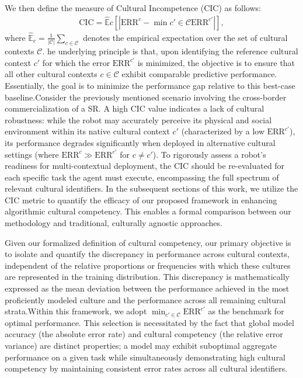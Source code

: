 We then define the measure of Cultural Incompetence (CIC) as follows:
%
\begin{align}\label{ch2:eq:cic}
\text{CIC} = \hat{\mathbb{E}}c \left[ \left| \text{ERR}^c - \min{c' \in \mathcal{C}} \text{ERR}^{c'} \right| \right],
\end{align}
%
where $\hat{\mathbb{E}}_c = \frac{1}{|\mathcal{C}|} \sum_{c \in \mathcal{C}}$ denotes the empirical expectation over the set of cultural contexts $\mathcal{C}$.
he underlying principle is that, upon identifying the reference cultural context $c'$ for which the error $\text{ERR}^{c'}$ is minimized, the objective is to ensure that all other cultural contexts $c \in \mathcal{C}$ exhibit comparable predictive performance. Essentially, the goal is to minimize the performance gap relative to this best-case baseline.Consider the previously mentioned scenario involving the cross-border commercialization of a SR. 
A high CIC value indicates a lack of cultural robustness: while the robot may accurately perceive its physical and social environment within its native cultural context $c'$ (characterized by a low $\text{ERR}^{c'}$), its performance degrades significantly when deployed in alternative cultural settings (where $\text{ERR}^c \gg \text{ERR}^{c'}$ for $c \neq c'$).
To rigorously assess a robot's readiness for multi-contextual deployment, the CIC should be re-evaluated for each specific task the agent must execute, encompassing the full spectrum of relevant cultural identifiers. 
In the subsequent sections of this work, we utilize the CIC metric to quantify the efficacy of our proposed framework in enhancing algorithmic cultural competency. 
This enables a formal comparison between our methodology and traditional, culturally agnostic approaches.

Given our formalized definition of cultural competency, our primary objective is to isolate and quantify the discrepancy in performance across cultural contexts, independent of the relative proportions or frequencies with which these cultures are represented in the training distribution. This discrepancy is mathematically expressed as the mean deviation between the performance achieved in the most proficiently modeled culture and the performance across all remaining cultural strata.Within this framework, we adopt $\min_{c' \in \mathcal{C}} \text{ERR}^{c'}$ as the benchmark for optimal performance. This selection is necessitated by the fact that global model accuracy (the absolute error rate) and cultural competency (the relative error variance) are distinct properties; a model may exhibit suboptimal aggregate performance on a given task while simultaneously demonstrating high cultural competency by maintaining consistent error rates across all cultural identifiers.

